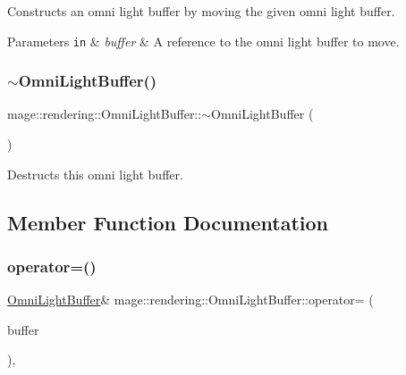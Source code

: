 Constructs an omni light buffer by moving the given omni light buffer.


\begin{DoxyParams}[1]{Parameters}
\mbox{\tt in}  & {\em buffer} & A reference to the omni light buffer to move. \\
\hline
\end{DoxyParams}
\hypertarget{structmage_1_1rendering_1_1_omni_light_buffer_a67eee7a5d21a124ffe74cd5ae94196b6}{}\label{structmage_1_1rendering_1_1_omni_light_buffer_a67eee7a5d21a124ffe74cd5ae94196b6} 
\subsubsection{\texorpdfstring{$\sim$\+Omni\+Light\+Buffer()}{~OmniLightBuffer()}}
{\footnotesize\ttfamily mage\+::rendering\+::\+Omni\+Light\+Buffer\+::$\sim$\+Omni\+Light\+Buffer (\begin{DoxyParamCaption}{ }\end{DoxyParamCaption})\hspace{0.3cm}{\ttfamily [default]}}

Destructs this omni light buffer. 

\subsection{Member Function Documentation}
\hypertarget{structmage_1_1rendering_1_1_omni_light_buffer_a915b047abdc1068279b8308b189b60f5}{}\label{structmage_1_1rendering_1_1_omni_light_buffer_a915b047abdc1068279b8308b189b60f5} 
\subsubsection{\texorpdfstring{operator=()}{operator=()}\hspace{0.1cm}{\footnotesize\ttfamily [1/2]}}
{\footnotesize\ttfamily \hyperlink{structmage_1_1rendering_1_1_omni_light_buffer}{Omni\+Light\+Buffer}\& mage\+::rendering\+::\+Omni\+Light\+Buffer\+::operator= (\begin{DoxyParamCaption}\item[{const \hyperlink{structmage_1_1rendering_1_1_omni_light_buffer}{Omni\+Light\+Buffer} \&}]{buffer }\end{DoxyParamCaption})\hspace{0.3cm}{\ttfamily [default]}, {\ttfamily [noexcept]}}

